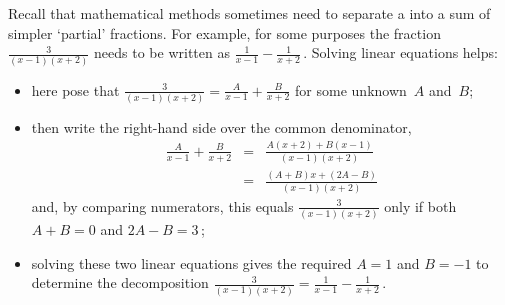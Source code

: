 \begin{OmitV1}
\begin{example} 
Recall that mathematical methods sometimes need to separate a  into a sum of simpler `partial' fractions.  
For example, for some purposes the fraction \(\frac3{(x-1)(x+2)}\) needs to be written as \(\frac1{x-1}-\frac1{x+2}\)\,.  
Solving linear equations helps: \begin{itemize}
\item here  pose that \(\frac3{(x-1)(x+2)} = \frac A{x-1}+\frac B{x+2}\) for some unknown~\(A\) and~\(B\); 
\item then write the right-hand side over the common denominator,
\begin{eqnarray*}
\frac A{x-1}+\frac B{x+2}
&=&\frac{A(x+2)+B(x-1)}{(x-1)(x+2)}
\\&=&\frac{(A+B)x+(2A-B)}{(x-1)(x+2)}
\end{eqnarray*}
and, by comparing numerators, this equals \(\frac3{(x-1)(x+2)}\) only if both \(A+B=0\) and \(2A-B=3\)\,; 
\item solving these two linear equations gives the required \(A=1\) and \(B=-1\) to determine the decomposition \(\frac3{(x-1)(x+2)}=\frac1{x-1}-\frac1{x+2}\)\,.
\end{itemize}



\end{example}
\end{OmitV1}
